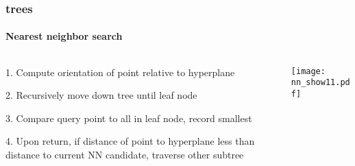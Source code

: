 \begin{frame}[noframenumbering]
  \frametitle{\kd trees}
  \framesubtitle{Nearest neighbor search}
  \begin{columns}[T]
    \begin{column}{.5\textwidth}
      \begin{block}{}%
        {\color{white} 1.\hspace{1mm} Compute orientation of point relative to hyperplane
          \\\vspace{0.4cm}
        
        2.\hspace{1mm} Recursively move down tree until leaf node\\\vspace{0.4cm}

        3.\hspace{1mm} Compare query point to all in leaf node, record smallest\\\vspace{0.4cm}
    
        {\color{graph-red}
        4.\hspace{1mm} Upon return, if distance of point to hyperplane less than distance to current
        NN candidate, traverse other subtree}}
      \end{block}
    \end{column}
    \begin{column}{.5\textwidth}
      \begin{block}{}
        \texttt{[image: nn\_show11.pdf]}
      \end{block}
    \end{column}
  \end{columns}
\end{frame}
